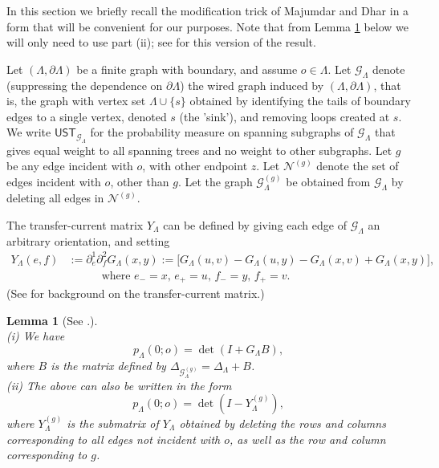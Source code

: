 \documentclass[11pt]{article}
\newtheorem{lemma}[theorem]{Lemma}
\theoremstyle{remark}
\def\cG{\mathcal{G}}
\def\cN{\mathcal{N}}
\newcommand{\eqn}[2]{\begin{equation}\label{#1}#2\end{equation}}
\newcommand{\eqnsplst}[1]{\begin{equation*}\begin{split}%
   #1\end{split}\end{equation*}}
\begin{document}
In this section we briefly recall the modification trick of Majumdar and Dhar \cite{Dhar1991,Majumdar1992} 
in a form that will be convenient for our purposes. Note that from 
Lemma \ref{lem:MD-trick} below we will only 
need to use part (ii); see \cite{Jarai2014minimal} for this version of the result.

Let $(\Lambda, \partial \Lambda)$ be a finite graph with boundary, 
and assume $o \in \Lambda$. Let $\cG_\Lambda$ denote 
(suppressing the dependence on $\partial \Lambda$) 
the wired graph induced by $(\Lambda, \partial \Lambda)$, that is, 
the graph with vertex set $\Lambda \cup \{ s \}$ obtained by identifying the tails
of boundary edges to a single vertex, denoted $s$ (the 'sink'), and removing loops 
created at $s$. We write $\mathsf{UST}_{\cG_\Lambda}$ for the probability measure 
on spanning subgraphs of $\cG_\Lambda$ that gives equal weight to all spanning trees 
and no weight to other subgraphs. Let $g$ be any edge incident with $o$, with other 
endpoint $z$. Let $\cN^{(g)}$ denote the set
of edges incident with $o$, other than $g$. Let the graph $\cG^{(g)}_\Lambda$ 
be obtained from $\cG_\Lambda$ by deleting all edges in $\cN^{(g)}$. 

The transfer-current matrix $Y_\Lambda$ can be defined by giving each edge of $\cG_\Lambda$ an 
arbitrary orientation, and setting 
\eqnsplst{
  Y_\Lambda(e,f)
  &:= \partial^1_e \partial^2_f G_\Lambda(x,y) 
  := \big[ G_\Lambda(u,v) - G_\Lambda(u,y) - G_\Lambda(x,v) + G_\Lambda(x,y) \big], \\ 
  &\qquad\quad \text{where $e_- = x$, $e_+ = u$, $f_- = y$, $f_+ = v$.} }
(See \cite{LyonsTrees} for background on the transfer-current matrix.)

\begin{lemma}[See \cite{Dhar1991,Majumdar1992,Jarai2014minimal}.]
\label{lem:MD-trick} \ \\
(i) We have 
\eqn{e:MD-trick}
{ p_\Lambda(0; o)
  = \det ( I + G_\Lambda B ), }
where $B$ is the matrix defined by $\Delta_{\cG^{(g)}_\Lambda} = \Delta_\Lambda + B$. \\
(ii) The above can also be written in the form
\eqn{e:MD-transf-curr}
{ p_\Lambda(0; o)
  = \det ( I - Y^{(g)}_\Lambda ), }
where $Y^{(g)}_\Lambda$ is the submatrix of $Y_\Lambda$ obtained by deleting the rows and columns 
corresponding to all edges not incident with $o$, as well as the row and column corresponding
to $g$.
\end{lemma}
\end{document}
